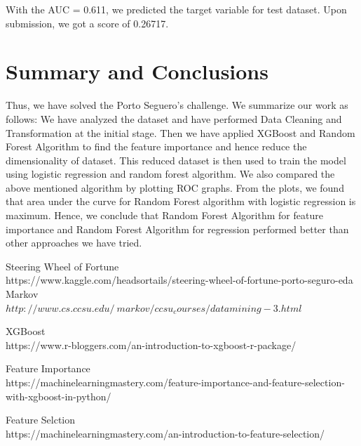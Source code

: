 \documentclass[fleqn,10pt]{SelfArx} %
\begin{document}
With the AUC = 0.611, we predicted the target variable for test dataset. Upon submission, we got a score of 0.26717.\\


\section{Summary and Conclusions}
Thus, we have solved the Porto Seguero's challenge. We summarize our work as follows: We have analyzed the dataset and have performed Data Cleaning and Transformation at the initial stage. Then we have applied XGBoost and Random Forest Algorithm to find the feature importance and hence reduce the dimensionality of dataset. This reduced dataset is then used to train the model using logistic regression and random forest algorithm. We also compared the above mentioned algorithm by plotting ROC graphs. From the plots, we found that area under the curve for Random Forest algorithm with logistic regression is maximum. Hence, we conclude that Random Forest Algorithm for feature importance and Random Forest Algorithm for regression   performed better than other approaches we have tried.\\ 


\begin{thebibliography}{9}
Steering Wheel of Fortune
\\https://www.kaggle.com/headsortails/steering-wheel-of-fortune-porto-seguro-eda
Markov
\\$http://www.cs.ccsu.edu/~markov/ccsu_courses/datamining-3.html$

XGBoost
\\https://www.r-bloggers.com/an-introduction-to-xgboost-r-package/

Feature Importance
\\https://machinelearningmastery.com/feature-importance-and-feature-selection-with-xgboost-in-python/
 
Feature Selction
\\https://machinelearningmastery.com/an-introduction-to-feature-selection/
\end{thebibliography}
\end{document}
